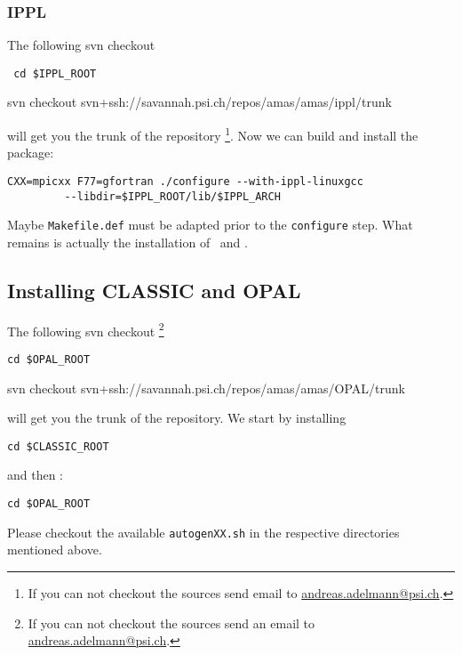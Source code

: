 \subsubsection{IPPL}
The following svn checkout
\begin{footnotesize}
\begin{verbatim} cd $IPPL_ROOT
\end{verbatim}
\end{footnotesize}
\begin{center}
svn checkout svn+ssh://savannah.psi.ch/repos/amas/amas/ippl/trunk
\end{center}
will get you the trunk of the repository \footnote{If you can not checkout the sources
send email to \url{andreas.adelmann@psi.ch}.}. Now we can build and install the package:
\begin{footnotesize}
\begin{verbatim}
CXX=mpicxx F77=gfortran ./configure --with-ippl-linuxgcc 
         --libdir=$IPPL_ROOT/lib/$IPPL_ARCH
\end{verbatim}
\end{footnotesize}
Maybe {\tt Makefile.def} must be adapted prior to the {\tt configure} step.
What remains is actually the installation of \classic\ and \opal.

\subsection{Installing CLASSIC and OPAL} \label{sec:instmacclop}
The following svn checkout \footnote{If you can not checkout the sources
send an email to \url{andreas.adelmann@psi.ch}.}
\begin{footnotesize}
\begin{verbatim}cd $OPAL_ROOT
\end{verbatim}
\end{footnotesize}
\begin{center}
svn checkout svn+ssh://savannah.psi.ch/repos/amas/amas/OPAL/trunk
\end{center}
will get you the trunk of the repository. We start by installing \classic\:
\begin{footnotesize}
\begin{verbatim}
cd $CLASSIC_ROOT
\end{verbatim}
\end{footnotesize}
and then \opal :
\begin{footnotesize}
\begin{verbatim}
cd $OPAL_ROOT
\end{verbatim}
\end{footnotesize}
Please checkout the available {\tt autogenXX.sh} in the respective directories mentioned above.

